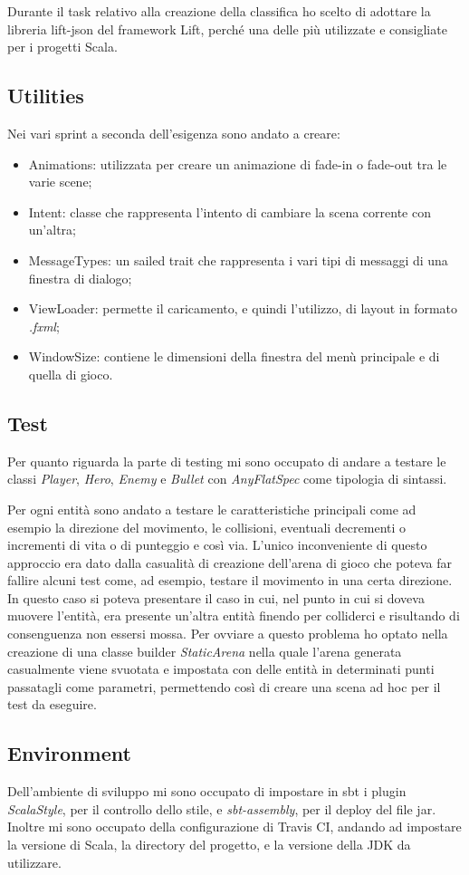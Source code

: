 Durante il task relativo alla creazione della classifica ho scelto di adottare la libreria lift-json del framework Lift, perché una delle più utilizzate e consigliate per i progetti Scala.

\subsection{Utilities}
Nei vari sprint a seconda dell'esigenza sono andato a creare:
\begin{itemize}
	\item Animations: utilizzata per creare un animazione di fade-in o fade-out tra le varie scene;
	\item Intent: classe che rappresenta l'intento di cambiare la scena corrente con un'altra;
	\item MessageTypes: un sailed trait che rappresenta i vari tipi di messaggi di una finestra di dialogo;
	\item ViewLoader: permette il caricamento, e quindi l'utilizzo, di layout in formato \textit{.fxml};
	\item WindowSize: contiene le dimensioni della finestra del menù principale e di quella di gioco.
		
\end{itemize}

\subsection{Test}
Per quanto riguarda la parte di testing mi sono occupato di andare a testare le classi \textit{Player}, \textit{Hero}, \textit{Enemy} e \textit{Bullet} con \textit{AnyFlatSpec} come tipologia di sintassi.

Per ogni entità sono andato a testare le caratteristiche principali come ad esempio la direzione del movimento, le collisioni, eventuali decrementi o incrementi di vita o di punteggio e così via.
L'unico inconveniente di questo approccio era dato dalla casualità di creazione dell'arena di gioco che poteva far fallire alcuni test come, ad esempio, testare il movimento in una certa direzione.
In questo caso si poteva presentare il caso in cui, nel punto in cui si doveva muovere l'entità, era presente un'altra entità finendo per colliderci e risultando di consenguenza non essersi mossa.
Per ovviare a questo problema ho optato nella creazione di una classe builder \textit{StaticArena} nella quale l'arena generata casualmente viene svuotata e impostata con delle entità in determinati punti passatagli come parametri, permettendo così di creare una scena ad hoc per il test da eseguire.

\subsection{Environment}
Dell'ambiente di sviluppo mi sono occupato di impostare in sbt i plugin \textit{ScalaStyle}, per il controllo dello stile, e \textit{sbt-assembly}, per il deploy del file jar.
Inoltre mi sono occupato della configurazione di Travis CI, andando ad impostare la versione di Scala, la directory del progetto, e la versione della JDK da utilizzare.
